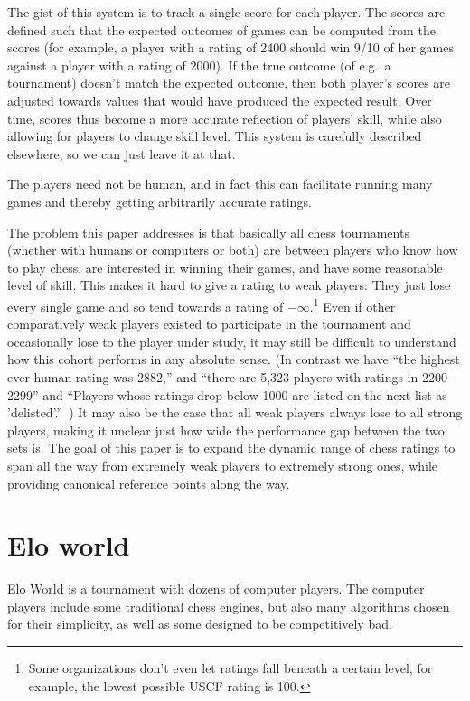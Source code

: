 \documentclass[10pt,preprint,twocolumn]{acmart}
\begin{document}
The gist of this system is to track a single score for each player.
The scores are defined such that the expected outcomes of games can be
computed from the scores (for example, a player with a rating of 2400
should win 9/10 of her games against a player with a rating of 2000).
If the true outcome (of e.g.~a tournament) doesn't match the expected
outcome, then both player's scores are adjusted towards values that
would have produced the expected result. Over time, scores thus become
a more accurate reflection of players' skill, while also allowing for
players to change skill level. This system is carefully described
elsewhere, so we can just leave it at that.

The players need not be human, and in fact this can facilitate running
many games and thereby getting arbitrarily accurate ratings.

The problem this paper addresses is that basically all chess
tournaments (whether with humans or computers or both) are between
players who know how to play chess, are interested in winning their
games, and have some reasonable level of skill. This makes it hard to
give a rating to weak players: They just lose every single game and so
tend towards a rating of $-\infty$.\footnote{Some organizations don't
  even let ratings fall beneath a certain level, for example, the
  lowest possible USCF rating is 100.} Even if other comparatively
weak players existed to participate in the tournament and occasionally
lose to the player under study, it may still be difficult to
understand how this cohort performs in any absolute sense. (In
contrast we have ``the highest ever human rating was 2882,'' and
``there are 5,323 players with ratings in 2200--2299'' and ``Players
whose ratings drop below 1000 are listed on the next list as
'delisted'.''~\cite{fideratings}) It may also be the case that all
weak players always lose to all strong players, making it unclear just
how wide the performance gap between the two sets is. The goal of
this paper is to expand the dynamic range of chess ratings to span
all the way from extremely weak players to extremely strong ones, while
providing canonical reference points along the way.

\section{Elo world}

Elo World is a tournament with dozens of computer players. The
computer players include some traditional chess engines, but also many
algorithms chosen for their simplicity, as well as some designed to
be competitively bad.
\end{document}
